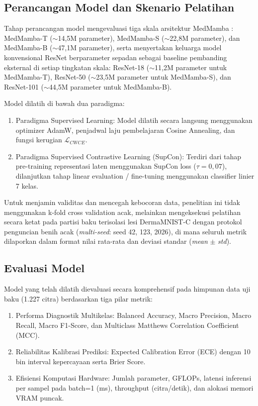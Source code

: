 \subsection{Perancangan Model dan Skenario Pelatihan} \label{III.Perancangan}
Tahap perancangan model mengevaluasi tiga skala arsitektur MedMamba \cite{yue2024medmamba}: MedMamba-T ($\sim$14,5M parameter), MedMamba-S ($\sim$22,8M parameter), dan MedMamba-B ($\sim$47,1M parameter), serta menyertakan keluarga model konvensional ResNet berparameter sepadan sebagai baseline pembanding eksternal di setiap tingkatan skala: ResNet-18 ($\sim$11,2M parameter untuk MedMamba-T), ResNet-50 ($\sim$23,5M parameter untuk MedMamba-S), dan ResNet-101 ($\sim$44,5M parameter untuk MedMamba-B). \par

Model dilatih di bawah dua paradigma:
\begin{enumerate}[noitemsep]
	\item Paradigma Supervised Learning: Model dilatih secara langsung menggunakan optimizer AdamW, penjadwal laju pembelajaran Cosine Annealing, dan fungsi kerugian $\mathcal{L}_{CWCE}$.
	\item Paradigma Supervised Contrastive Learning (SupCon): Terdiri dari tahap pre-training representasi laten menggunakan SupCon loss ($\tau = 0,07$), dilanjutkan tahap linear evaluation / fine-tuning menggunakan classifier linier 7 kelas.
\end{enumerate}
Untuk menjamin validitas dan mencegah kebocoran data, penelitian ini tidak menggunakan k-fold cross validation acak, melainkan mengeksekusi pelatihan secara ketat pada partisi baku terisolasi lesi DermaMNIST-C dengan protokol penguncian benih acak (\textit{multi-seed}: seed 42, 123, 2026), di mana seluruh metrik dilaporkan dalam format nilai rata-rata dan deviasi standar (\textit{mean} $\pm$ \textit{std}). \par

\subsection{Evaluasi Model} \label{III.Evaluasi}
Model yang telah dilatih dievaluasi secara komprehensif pada himpunan data uji baku (1.227 citra) berdasarkan tiga pilar metrik:
\begin{enumerate}[noitemsep]
	\item Performa Diagnostik Multikelas: Balanced Accuracy, Macro Precision, Macro Recall, Macro F1-Score, dan Multiclass Matthews Correlation Coefficient (MCC).
	\item Reliabilitas Kalibrasi Prediksi: Expected Calibration Error (ECE) dengan 10 bin interval kepercayaan serta Brier Score.
	\item Efisiensi Komputasi Hardware: Jumlah parameter, GFLOPs, latensi inferensi per sampel pada batch=1 (ms), throughput (citra/detik), dan alokasi memori VRAM puncak.
\end{enumerate}

